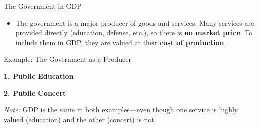 \documentclass[10pt,aspectratio=169]{beamer}
\begin{document}
\begin{frame}{The Government in GDP}

\begin{itemize}
\item The government is a major producer of goods and services.
\itemvso Many services are provided directly (education, defense, etc.), so there is \textbf{no market price}.
\itemvso To include them in GDP, they are valued at their \textbf{cost of production}.
\end{itemize}
\end{frame}

\begin{frame}{Example: The Government as a Producer}

\textbf{1. Public Education}

\begin{table}
\end{table}

\medskip

\textbf{2. Public Concert}

\begin{table}
\end{table}

\medskip

\textit{Note:} GDP is the same in both examples—even though one service is highly valued (education) and the other (concert) is not.  
\end{frame}
\end{document}
